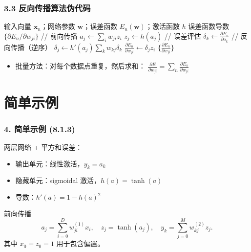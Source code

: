 \documentclass[t,aspectratio=169]{beamer} %
\begin{document}
\begin{frame}[shrink=0.33]
    \frametitle{3.3 反向传播算法伪代码}
    \begin{algorithm}[H]
    \caption{Backpropagation}
    \begin{algorithmic}
    \Input 输入向量 $\mathbf{x}_n$；网络参数 $\mathbf{w}$；误差函数 $E_n(\mathbf{w})$；激活函数 $h$
    \Output 误差函数导数 $\{\partial E_n / \partial w_{ji}\}$
    \State // 前向传播
        \State $a_j \leftarrow \sum_i w_{ji} z_i$ 
        \State $z_j \leftarrow h(a_j)$
    \EndFor
    \State // 误差评估
        \State $\delta_k \leftarrow \frac{\partial E_n}{\partial a_k}$
    \EndFor
    \State // 反向传播（逆序）
        \State $\delta_j \leftarrow h'(a_j) \sum_k w_{kj} \delta_k$
        \State $\frac{\partial E_n}{\partial w_{ji}} \leftarrow \delta_j z_i$
    \EndFor
    \State \Return $\{\frac{\partial E_n}{\partial w_{ji}}\}$
    \end{algorithmic}
    \end{algorithm}
    \begin{itemize}
        \item 批量方法：对每个数据点重复，然后求和：
        $\frac{\partial E}{\partial w_{ji}} = \sum_n \frac{\partial E_n}{\partial w_{ji}}$
    \end{itemize}
\end{frame}

\section{简单示例}

\begin{frame}
    \frametitle{4. 简单示例 (8.1.3)}
    两层网络 + 平方和误差：
    \begin{itemize}
        \item 输出单元：\alert{线性}激活，$y_k = a_k$
        \item 隐藏单元：\alert{sigmoidal} 激活，$h(a) = \tanh(a)$
        \item 导数：$h'(a) = 1 - h(a)^2$
    \end{itemize}
    \begin{block}{前向传播}
        $$
            a_j = \sum_{i=0}^D w_{ji}^{(1)} x_i, \quad %
            z_j = \tanh(a_j), \quad %
            y_k = \sum_{j=0}^M w_{kj}^{(2)} z_j. %
        $$
        其中 $x_0 = z_0 = 1$ 用于包含偏置。
    \end{block}
\end{frame}
\end{document}

